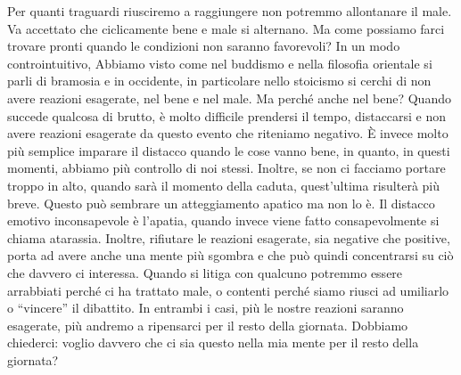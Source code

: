 \documentclass[12pt]{book} %
\begin{document}
Per quanti traguardi riusciremo a raggiungere non potremmo allontanare il male. Va accettato che ciclicamente bene e
male si alternano. Ma come possiamo farci trovare pronti quando le condizioni non saranno favorevoli? In un modo
controintuitivo, Abbiamo visto come nel buddismo e nella filosofia orientale si parli di bramosia e in occidente, in
particolare nello stoicismo si cerchi di non avere reazioni esagerate, nel bene e nel male. Ma perché anche nel bene?
Quando succede qualcosa di brutto, è molto difficile prendersi il tempo, distaccarsi e non avere reazioni esagerate da
questo evento che riteniamo negativo. È invece molto più semplice imparare il distacco quando le cose vanno bene, in
quanto, in questi momenti, abbiamo più controllo di noi stessi. Inoltre, se non ci facciamo portare troppo in alto,
quando sarà il momento della caduta, quest'ultima risulterà più breve. Questo può sembrare un
atteggiamento apatico ma non lo è. Il distacco emotivo inconsapevole è l'apatia, quando invece viene fatto
consapevolmente si chiama atarassia. Inoltre, rifiutare le reazioni esagerate, sia negative che positive, porta ad
avere anche una mente più sgombra e che può quindi concentrarsi su ciò che davvero ci interessa. Quando si litiga con
qualcuno potremmo essere arrabbiati perché ci ha trattato male, o contenti perché siamo riusci ad umiliarlo o “vincere”
il dibattito. In entrambi i casi, più le nostre reazioni saranno esagerate, più andremo a ripensarci per il resto della
giornata. Dobbiamo chiederci: voglio davvero che ci sia questo nella mia mente per il resto della giornata?
\end{document}
